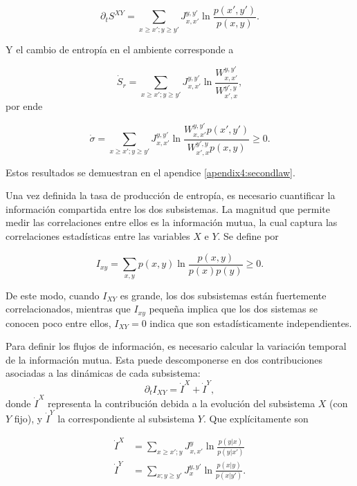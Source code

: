 \begin{equation*}
    \partial_{t}S^{XY} = \sum_{x\geq x'; y\geq y'} J_{x,x'}^{y,y'} \ln \frac{p(x',y')}{p(x,y)}.
\end{equation*}

Y el cambio de entropía en el ambiente corresponde a

\begin{equation*}
    \dot{S}_{r} = \sum_{x\geq x'; y\geq y'} J_{x,x'}^{y,y'} \ln \frac{W_{x,x'}^{y,y'}}{W_{x',x}^{y',y}},
\end{equation*}
por ende

\begin{equation*}
    \dot{\sigma} = \sum_{x\geq x'; y\geq y'} J_{x,x'}^{y,y'} \ln \frac{ W_{x,x'}^{y,y'}p(x',y')  }{ W_{x',x}^{y',y}p(x,y) } \geq 0.
\end{equation*}

Estos resultados se demuestran en el apendice \ref{apendix4:secondlaw}.  

Una vez definida la tasa de producción de entropía, es necesario cuantificar la información compartida entre los dos subsistemas. La magnitud que permite medir las correlaciones entre ellos es la información mutua, la cual captura las correlaciones estadísticas entre las variables \( X \) e \( Y \). Se define por

\begin{equation*}
    I_{xy} = \sum_{x,y} p(x,y) \ln \frac{p(x,y)}{p(x)p(y)} \geq 0. 
\end{equation*}

De este modo, cuando \( I_{XY} \) es grande, los dos subsistemas están fuertemente correlacionados, mientras que $I_{xy}$ pequeña implica que los dos sistemas se conocen poco entre ellos, \( I_{XY} = 0 \) indica que son estadísticamente independientes.

Para definir los flujos de información, es necesario calcular la variación temporal de la información mutua. Esta puede descomponerse en dos contribuciones asociadas a las dinámicas de cada subsistema:
\[
\partial_t I_{XY} = \dot{I}^{X} + \dot{I}^{Y},
\]
donde \( \dot{I}^{X} \) representa la contribución debida a la evolución del subsistema \( X \) (con \( Y \) fijo), y \( \dot{I}^{Y} \) la correspondiente al subsistema \( Y \). Que explícitamente son

\begin{align*}
    \dot{I}^{X} & = \sum_{x\geq x'; y}J_{x,x'}^{y} \ln \frac{ p(y|x) }{p(y|x')} \\
    \dot{I}^{Y} & = \sum_{x;y\geq y'} J_{x}^{y,y'} \ln \frac{p(x|y)}{ p(x|y') }.
\end{align*}

